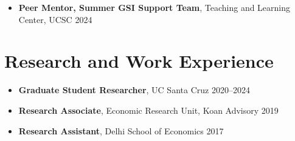 \documentclass[letter,11pt]{article}
\newcommand{\dateright}[1]{\hfill{\small #1}}
\begin{document}
\begin{itemize}
        \item[] \textbf{Peer Mentor, Summer GSI Support Team}, Teaching and Learning Center, UCSC \dateright{2024}
\end{itemize}

\section{Research and Work Experience}
\begin{itemize}
    \item[] \textbf{Graduate Student Researcher}, UC Santa Cruz \dateright{2020--2024}
    \item[] \textbf{Research Associate}, Economic Research Unit, Koan Advisory \dateright{2019}
    \item[] \textbf{Research Assistant}, Delhi School of Economics \dateright{2017}
    
\end{itemize}
\end{document}
